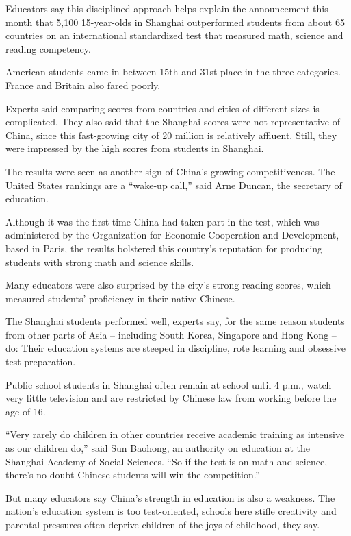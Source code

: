 ﻿\documentclass[12pt]{article}
\begin{document}
Educators say this disciplined approach helps explain the announcement this month that 5,100
15-year-olds in Shanghai outperformed students from about 65 countries on an international
standardized test that measured math, science and reading competency.

American students came in between 15th and 31st place in the three categories. France and Britain
also fared poorly.

Experts said comparing scores from countries and cities of different sizes is complicated. They also
said that the Shanghai scores were not representative of China, since this fast-growing city of 20
million is relatively affluent. Still, they were impressed by the high scores from students in
Shanghai.

The results were seen as another sign of China's growing competitiveness. The United States rankings
are a ``wake-up call,'' said Arne Duncan, the secretary of education.

Although it was the first time China had taken part in the test, which was administered by the
Organization for Economic Cooperation and Development, based in Paris, the results bolstered this
country's reputation for producing students with strong math and science skills.

Many educators were also surprised by the city's strong reading scores, which measured students'
proficiency in their native Chinese.

The Shanghai students performed well, experts say, for the same reason students from other parts of
Asia -- including South Korea, Singapore and Hong Kong -- do: Their education systems are steeped in
discipline, rote learning and obsessive test preparation.

Public school students in Shanghai often remain at school until 4 p.m., watch very little television
and are restricted by Chinese law from working before the age of 16.

``Very rarely do children in other countries receive academic training as intensive as our children
do,'' said Sun Baohong, an authority on education at the Shanghai Academy of Social Sciences. ``So
if the test is on math and science, there's no doubt Chinese students will win the competition.''

But many educators say China's strength in education is also a weakness. The nation's education
system is too test-oriented, schools here stifle creativity and parental pressures often deprive
children of the joys of childhood, they say.
\end{document}
